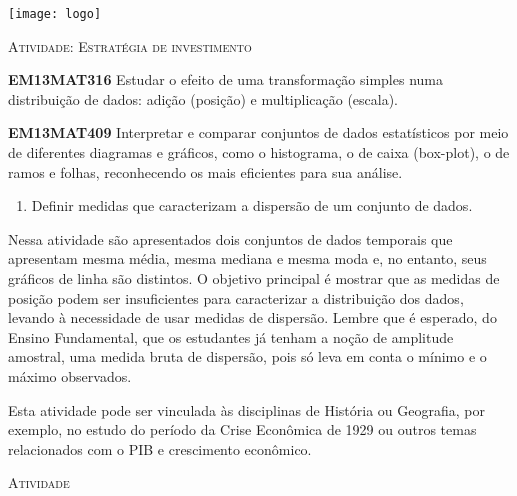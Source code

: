 \documentclass[10 pt,usenames,dvipsnames, oneside]{article}
\begin{document}
\begin{center}
  \begin{minipage}[l]{3cm}
\texttt{[image: logo]}    
\end{minipage}\hfill
\begin{minipage}[r]{.8\textwidth}
 {\Large \scshape Atividade: Estratégia de investimento}  
\end{minipage}
\end{center}
\vspace{.2cm}

\ifdefined\prof
\begin{objetivos}
\item \textbf{EM13MAT316} Estudar o efeito de uma transformação simples numa
distribuição de dados: adição (posição) e multiplicação (escala).
\item \textbf{EM13MAT409} Interpretar e comparar conjuntos de dados estatísticos por meio de diferentes diagramas e gráficos, como o histograma, o de caixa (box-plot), o de ramos e folhas, reconhecendo os mais eficientes para sua análise.
\end{objetivos}

\begin{goals}
\begin{enumerate}
\item Definir medidas que caracterizam a dispersão de um conjunto de dados.
\end{enumerate}

\tcblower

Nessa atividade são apresentados dois conjuntos de dados temporais que apresentam mesma média, mesma mediana e mesma moda e, no entanto, seus gráficos de linha são distintos. O objetivo principal é mostrar que as medidas de posição podem ser insuficientes para caracterizar a distribuição dos dados, levando à necessidade de usar medidas de dispersão. Lembre que é esperado, do Ensino Fundamental, que os estudantes já tenham a noção de amplitude amostral, uma medida bruta de dispersão, pois só leva em conta o mínimo e o máximo observados.

Esta atividade pode ser vinculada às disciplinas de História ou Geografia, por exemplo, no estudo do período da Crise Econômica de 1929 ou outros temas relacionados com o PIB e crescimento econômico. 
\end{goals}

\bigskip
\begin{center}
{\large \scshape Atividade}
\end{center}
\fi
\end{document}
